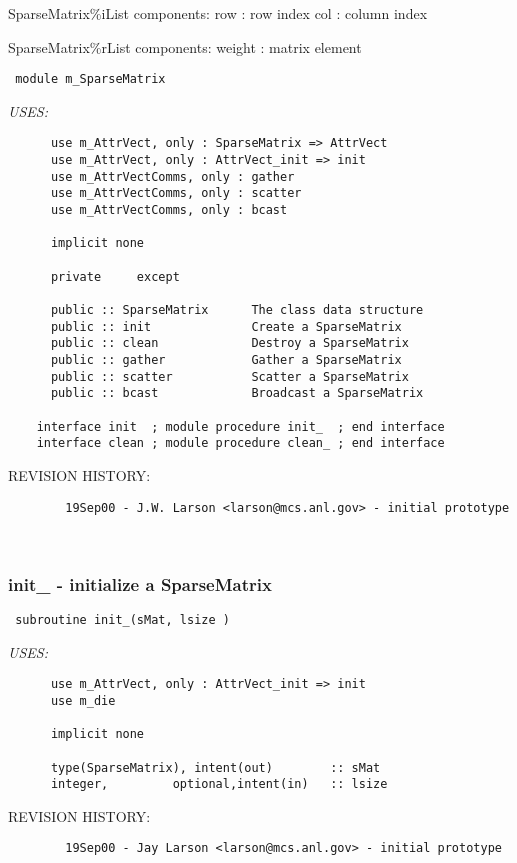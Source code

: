  SparseMatrix\%iList components:
     row : row index
     col : column index
 
  SparseMatrix\%rList components:
     weight : matrix element
 
\begin{verbatim} 
 module m_SparseMatrix\end{verbatim}{\em USES:}
\begin{verbatim}      use m_AttrVect, only : SparseMatrix => AttrVect
      use m_AttrVect, only : AttrVect_init => init
      use m_AttrVectComms, only : gather
      use m_AttrVectComms, only : scatter
      use m_AttrVectComms, only : bcast
 
      implicit none
 
      private     except
 
      public :: SparseMatrix      The class data structure
      public :: init              Create a SparseMatrix
      public :: clean             Destroy a SparseMatrix
      public :: gather            Gather a SparseMatrix
      public :: scatter           Scatter a SparseMatrix
      public :: bcast             Broadcast a SparseMatrix
 
    interface init  ; module procedure init_  ; end interface
    interface clean ; module procedure clean_ ; end interface
 \end{verbatim}{\sf REVISION HISTORY:}
\begin{verbatim}        19Sep00 - J.W. Larson <larson@mcs.anl.gov> - initial prototype\end{verbatim}
 
 
\mbox{}\hrulefill\ 
 

 \subsubsection{init\_ - initialize a SparseMatrix}


 
 
\begin{verbatim} 
 subroutine init_(sMat, lsize )\end{verbatim}{\em USES:}
\begin{verbatim}      use m_AttrVect, only : AttrVect_init => init
      use m_die
 
      implicit none
 
      type(SparseMatrix), intent(out)        :: sMat
      integer,         optional,intent(in)   :: lsize
 \end{verbatim}{\sf REVISION HISTORY:}
\begin{verbatim}        19Sep00 - Jay Larson <larson@mcs.anl.gov> - initial prototype\end{verbatim}
 
